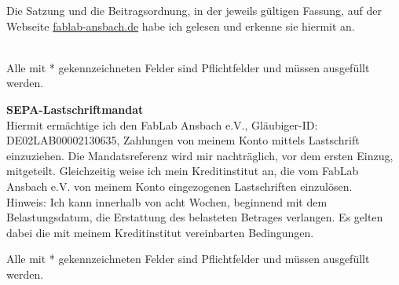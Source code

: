 Die Satzung und die Beitragsordnung, in der jeweils gültigen Fassung, auf der Webseite \href{https://www.fablab-ansbach.de/verein}{fablab-ansbach.de} habe ich gelesen und erkenne sie hiermit an. \\ \\

\begin{Form}
	\hfill {}
\end{Form}

\vfill
{\small Alle mit * gekennzeichneten Felder sind Pflichtfelder und müssen ausgefüllt werden.}

\newpage

\textbf{SEPA-Lastschriftmandat}\\
Hiermit ermächtige ich den FabLab Ansbach e.V., Gläubiger-ID: DE02LAB00002130635, Zahlungen von meinem Konto
mittels Lastschrift einzuziehen. Die Mandatsreferenz wird mir nachträglich, vor dem ersten Einzug, mitgeteilt. Gleichzeitig
weise ich mein Kreditinstitut an, die vom FabLab Ansbach e.V. von meinem Konto eingezogenen Lastschriften einzulösen. \\

{\small Hinweis:
Ich kann innerhalb von acht Wochen, beginnend mit dem Belastungsdatum, die Erstattung des belasteten Betrages verlangen. Es gelten dabei die mit
meinem Kreditinstitut vereinbarten Bedingungen.} \\

\begin{Form}
	\setlength{\baselineskip}{2.8\baselineskip}
	\setlength{\parskip}{0.8ex}
	
    \hfill {}	\hfill {}
	\hfill {}
	\hfill {}	
		
\end{Form}

\vspace{10ex}

\begin{Form}
	\hfill {}
\end{Form}

\vfill
{\small Alle mit * gekennzeichneten Felder sind Pflichtfelder und müssen ausgefüllt werden.}
	
